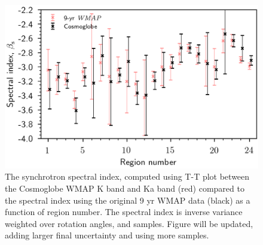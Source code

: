 \documentclass[twocolumn]{../../common/aa}
\newcommand{\red}[0]{\color{red}}
\begin{document}
\begin{figure}
	\centering
	\includegraphics[width=\linewidth]{figures/region_beta_cosmoglobe_vs_wmap.png}
	\caption{The synchrotron spectral index, computed using T-T plot between the Cosmoglobe WMAP K band and Ka band (red) compared to the spectral index using the original 9 yr WMAP data (black) as a function of region number. The spectral index is inverse variance weighted over rotation angles, and samples. {\red Figure will be updated, adding larger final uncertainty and using more samples.}}
        \label{fig:beta_region}
\end{figure}
\end{document}
